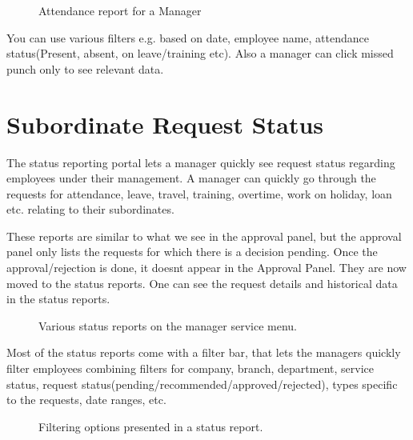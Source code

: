 \documentclass[letterpaper,10pt,english]{sphinxmanual}
\begin{document}
\begin{figure}[htbp]
\centering
\capstart

\noindent{}
\caption{Attendance report for a Manager}\label{\detokenize{manager/attendance-report:id1}}\end{figure}

You can use various filters e.g. based on date, employee name, attendance status(Present, absent, on leave/training etc). Also a manager can click missed punch only to see relevant data.


\section{Subordinate Request Status}
\label{\detokenize{manager/status-reporting:subordinate-request-status}}\label{\detokenize{manager/status-reporting::doc}}
The status reporting portal lets a manager quickly see request status regarding employees under their management. A manager can quickly go through the requests for attendance, leave, travel, training, overtime, work on holiday, loan etc.  relating to their subordinates.

These reports are similar to what we see in the approval panel, but the approval panel only lists the requests for which there is a decision pending. Once the approval/rejection is done, it doesnt appear in the Approval Panel. They are now moved to the status reports. One can see the request details and historical data in the status reports.

\begin{figure}[htbp]
\centering
\capstart

\noindent{}
\caption{Various status reports on the manager service menu.}\label{\detokenize{manager/status-reporting:id1}}\end{figure}

Most of the status reports come with a filter bar, that lets the managers quickly filter employees combining filters for company, branch, department, service status, request status(pending/recommended/approved/rejected), types specific to the requests, date ranges, etc.

\begin{figure}[htbp]
\centering
\capstart

\noindent{}
\caption{Filtering options presented in a status report.}\label{\detokenize{manager/status-reporting:id2}}\end{figure}
\end{document}
